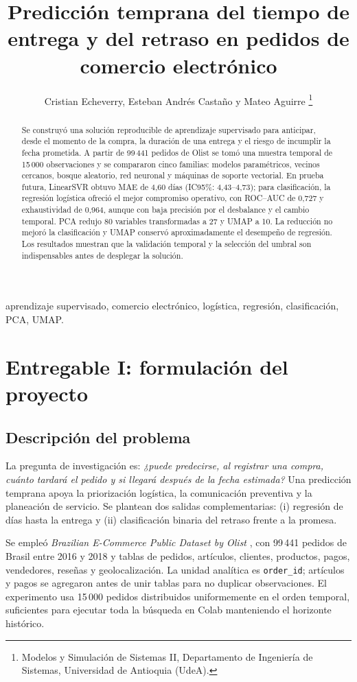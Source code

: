 \documentclass[journal]{IEEEtran}
\title{Predicción temprana del tiempo de entrega y del retraso en pedidos de comercio electrónico}
\author{Cristian Echeverry, Esteban Andrés Castaño y Mateo Aguirre%
\thanks{Modelos y Simulación de Sistemas II, Departamento de Ingeniería de Sistemas, Universidad de Antioquia (UdeA).}}
\begin{document}
\maketitle

\begin{abstract}
Se construyó una solución reproducible de aprendizaje supervisado para anticipar, desde el momento de la compra, la duración de una entrega y el riesgo de incumplir la fecha prometida. A partir de 99\,441 pedidos de Olist se tomó una muestra temporal de 15\,000 observaciones y se compararon cinco familias: modelos paramétricos, vecinos cercanos, bosque aleatorio, red neuronal y máquinas de soporte vectorial. En prueba futura, LinearSVR obtuvo MAE de 4,60 días (IC95\%: 4,43--4,73); para clasificación, la regresión logística ofreció el mejor compromiso operativo, con ROC--AUC de 0,727 y exhaustividad de 0,964, aunque con baja precisión por el desbalance y el cambio temporal. PCA redujo 80 variables transformadas a 27 y UMAP a 10. La reducción no mejoró la clasificación y UMAP conservó aproximadamente el desempeño de regresión. Los resultados muestran que la validación temporal y la selección del umbral son indispensables antes de desplegar la solución.
\end{abstract}

\begin{IEEEkeywords}
aprendizaje supervisado, comercio electrónico, logística, regresión, clasificación, PCA, UMAP.
\end{IEEEkeywords}

\section{Entregable I: formulación del proyecto}
\subsection{Descripción del problema}
La pregunta de investigación es: \emph{¿puede predecirse, al registrar una compra, cuánto tardará el pedido y si llegará después de la fecha estimada?} Una predicción temprana apoya la priorización logística, la comunicación preventiva y la planeación de servicio. Se plantean dos salidas complementarias: (i) regresión de días hasta la entrega y (ii) clasificación binaria del retraso frente a la promesa.

Se empleó \emph{Brazilian E-Commerce Public Dataset by Olist} \cite{olist2018dataset}, con 99\,441 pedidos de Brasil entre 2016 y 2018 y tablas de pedidos, artículos, clientes, productos, pagos, vendedores, reseñas y geolocalización. La unidad analítica es \texttt{order\_id}; artículos y pagos se agregaron antes de unir tablas para no duplicar observaciones. El experimento usa 15\,000 pedidos distribuidos uniformemente en el orden temporal, suficientes para ejecutar toda la búsqueda en Colab manteniendo el horizonte histórico.
\end{document}
